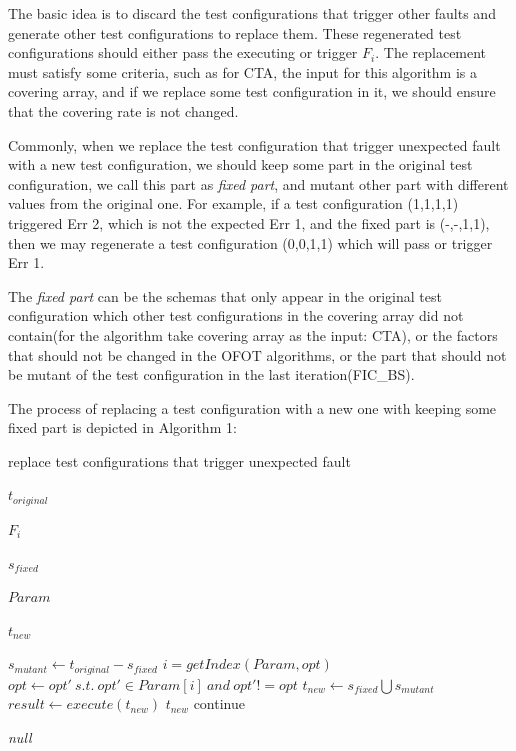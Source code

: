 \documentclass{sig-alternate}
\begin{document}
The basic idea is to discard the test configurations that trigger other faults and generate other test configurations to replace them. These regenerated test configurations should either pass the executing or trigger $F_{i}$.  The replacement must satisfy some criteria, such as for CTA, the input for this algorithm is a covering array, and if we replace some test configuration in it, we should ensure that the covering rate is not changed.

Commonly, when we replace the test configuration that trigger unexpected fault with a new test configuration, we should keep some part in the original test configuration, we call this part as \emph{fixed part}, and mutant other part with different values from the original one. For example, if a test configuration (1,1,1,1) triggered Err 2, which is not the expected Err 1, and the fixed part is (-,-,1,1), then we may regenerate a test configuration (0,0,1,1) which will pass or trigger Err 1.

The \emph{fixed part} can be the schemas that only appear in the original test configuration which other test configurations in the covering array did not contain(for the algorithm take covering array as the input: CTA), or the factors that should not be changed in the OFOT algorithms, or the part that should not be mutant of the test configuration in the last iteration(FIC\_BS).

The process of replacing a test configuration with a new one with keeping some fixed part is depicted in Algorithm 1:

\begin{algorithm}
  \caption{replace test configurations that trigger unexpected fault}
  \begin{algorithmic}[1]
     \Require

     $t_{original}$ 

     $F_{i}$ 

     $s_{fixed}$ 

     $Param$ 


     \Ensure  $t_{new}$ 

       \State $s_{mutant} \leftarrow t_{original} - s_{fixed}$
          \State $i = getIndex(Param,opt) $
          \State $opt \leftarrow opt' \ s.t.\ opt' \in Param[i]\ and\ opt' != opt$
       \EndFor
       \State $t_{new} \leftarrow s_{fixed} \bigcup s_{mutant} $
       \State $result \leftarrow execute(t_{new})$
         \State \Return $t_{new}$
       \Else
         \State continue
       \EndIf
     \EndWhile

     \State \Return \emph{null}
  \end{algorithmic}
\end{algorithm}
\end{document}
